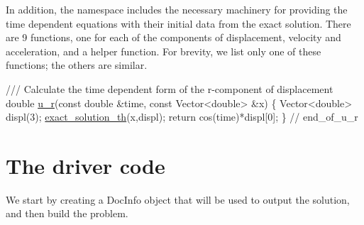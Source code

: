 In addition, the namespace includes the necessary machinery for providing the time dependent equations with their initial data from the exact solution. There are 9 functions, one for each of the components of displacement, velocity and acceleration, and a helper function. For brevity, we list only one of these functions; the others are similar.


\begin{DoxyCodeInclude}
 \textcolor{comment}{/// Calculate the time dependent form of the r-component of displacement}
 \textcolor{keywordtype}{double} \hyperlink{namespaceGlobal__Parameters_ae600c7d1b0928a5cb532fa3a93bab338}{u\_r}(\textcolor{keyword}{const} \textcolor{keywordtype}{double} &time, \textcolor{keyword}{const} Vector<double> &x)
  \{
   Vector<double> displ(3);
   \hyperlink{namespaceGlobal__Parameters_a42f4ce30b09a582bb2d85ddb6f087f80}{exact\_solution\_th}(x,displ);
   \textcolor{keywordflow}{return} cos(time)*displ[0];
  \} \textcolor{comment}{// end\_of\_u\_r}

\end{DoxyCodeInclude}




 

\hypertarget{index_main}{}\section{The driver code}\label{index_main}
We start by creating a {\ttfamily Doc\+Info} object that will be used to output the solution, and then build the problem.

